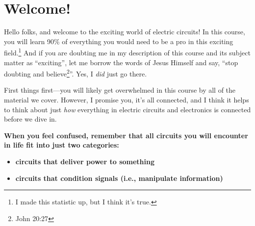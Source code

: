 \chapter{Welcome!}
\label{chap:welcome}
Hello folks, and welcome to the exciting world of electric circuits! In this course, you will learn 90\% of everything you would need to be a pro in this exciting field.\footnote{I made this statistic up, but I think it's true.} And if you are doubting me in my description of this course and its subject matter as ``exciting'', let me borrow the words of Jesus Himself and say, ``stop doubting and believe\footnote{John 20:27}''. Yes, I \textit{did} just go there. 
\par
First things first---you will likely get overwhelmed in this course by all of the material we cover. However, I promise you, it's all connected, and I think it helps to think about just \textit{how} everything in electric circuits and electronics is connected before we dive in.
\par
\textbf{When you feel confused, remember that all circuits you will encounter in life fit into just two categories:}
\begin{itemize} 
\item \textbf{circuits that deliver power to something}
\item \textbf{circuits that condition signals (i.e., manipulate information)}
\end{itemize}

